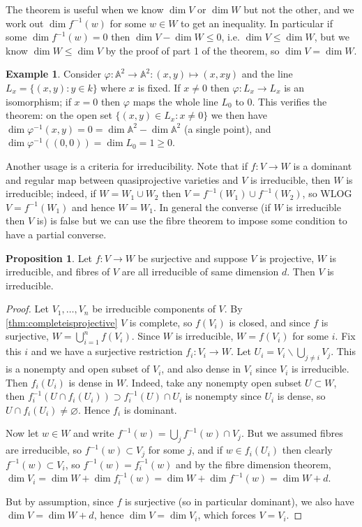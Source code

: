 \documentclass{article}
\newcommand{\A}{\mathbb{A}}
\theoremstyle{definition}
\newtheorem{prop}[defn]{Proposition}
\newtheorem{example}[defn]{Example}
\begin{document}
The theorem is useful when we know $\dim V$ or $\dim W$ but not the other, and we work out $\dim f^{-1}(w)$ for some $w\in W$ to get an inequality. In particular if some $\dim f^{-1}(w)=0$ then $\dim V-\dim W\leq 0$, i.e. $\dim V\leq \dim W$, but we know $\dim W\leq \dim V$ by the proof of part 1 of the theorem, so $\dim V=\dim W$.

\begin{example}
Consider $\varphi:\A^2\rightarrow\A^2:(x,y)\mapsto(x,xy)$ and the line $L_x=\{(x,y):y\in k\}$ where $x$ is fixed. If $x\neq 0$ then $\varphi:L_x\rightarrow L_x$ is an isomorphism; if $x=0$ then $\varphi$ maps the whole line $L_0$ to 0. This verifies the theorem: on the open set $\{(x,y)\in L_x:x\neq 0\}$ we then have $\dim\varphi^{-1}(x,y)=0=\dim\A^2-\dim\A^2$ (a single point), and $\dim\varphi^{-1}((0,0))=\dim L_0=1\geq 0$.
\end{example}

Another usage is a criteria for irreducibility. Note that if $f:V\rightarrow W$ is a dominant and regular map between quasiprojective varieties and $V$ is irreducible, then $W$ is irreducible; indeed, if $W=W_1\cup W_2$ then $V=f^{-1}(W_1)\cup f^{-1}(W_2)$, so WLOG $V=f^{-1}(W_1)$ and hence $W=W_1$. In general the converse (if $W$ is irreducible then $V$ is) is false but we can use the fibre theorem to impose some condition to have a partial converse.

\begin{prop}
\label{prop:fibVirrsamedimimpVirred}
Let $f:V\rightarrow W$ be surjective and suppose $V$ is projective, $W$ is irreducible, and fibres of $V$ are all irreducible of same dimension $d$. Then $V$ is irreducible.
\end{prop}
\begin{proof}
Let $V_1,\ldots,V_n$ be irreducible components of $V$. By \ref{thm:completeisprojective} $V$ is complete, so $f(V_i)$ is closed, and since $f$ is surjective, $W=\bigcup_{i=1}^nf(V_i)$. Since $W$ is irreducible, $W=f(V_i)$ for some $i$. Fix this $i$ and we have a surjective restriction $f_i:V_i\rightarrow W$. Let $U_i=V_i\backslash\bigcup_{j\neq i}V_j$. This is a nonempty and open subset of $V_i$, and also dense in $V_i$ since $V_i$ is irreducible. Then $f_i(U_i)$ is dense in $W$. Indeed, take any nonempty open subset $U\subset W$, then $f_i^{-1}(U\cap f_i(U_i))\supset f_i^{-1}(U)\cap U_i$ is nonempty since $U_i$ is dense, so $U\cap f_i(U_i)\neq\varnothing$. Hence $f_i$ is dominant.

Now let $w\in W$ and write $f^{-1}(w)=\bigcup_j f^{-1}(w)\cap V_j$. But we assumed fibres are irreducible, so $f^{-1}(w)\subset V_j$ for some $j$, and if $w\in f_i(U_i)$ then clearly $f^{-1}(w)\subset V_i$, so $f^{-1}(w)=f_i^{-1}(w)$ and by the fibre dimension theorem, $\dim V_i=\dim W+\dim f_i^{-1}(w)=\dim W+\dim f^{-1}(w)=\dim W+d$.

But by assumption, since $f$ is surjective (so in particular dominant), we also have $\dim V=\dim W+d$, hence $\dim V=\dim V_i$, which forces $V=V_i$.
\end{proof}
\end{document}
